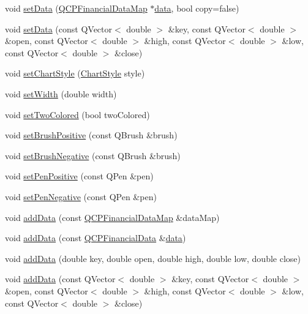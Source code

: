 \begin{DoxyCompactItemize}
\item 
void \hyperlink{classQCPFinancial_adf12a86082f1e488df6a4e8603f8fd6d}{set\-Data} (\hyperlink{qcustomplot_8h_a745c09823fae0974b50beca9bc3b3d7d}{\-Q\-C\-P\-Financial\-Data\-Map} $\ast$\hyperlink{classQCPFinancial_a58e05aefa057d16edfcc0334cf81c241}{data}, bool copy=false)
\item 
void \hyperlink{classQCPFinancial_a886881339d6447432af55adaad748c3c}{set\-Data} (const \-Q\-Vector$<$ double $>$ \&key, const \-Q\-Vector$<$ double $>$ \&open, const \-Q\-Vector$<$ double $>$ \&high, const \-Q\-Vector$<$ double $>$ \&low, const \-Q\-Vector$<$ double $>$ \&close)
\item 
void \hyperlink{classQCPFinancial_a5a59175d36279d71596e64d7bb65596f}{set\-Chart\-Style} (\hyperlink{classQCPFinancial_a0f800e21ee98d646dfc6f8f89d10ebfb}{\-Chart\-Style} style)
\item 
void \hyperlink{classQCPFinancial_a99633f8bac86a61d534ae5eeb1a3068f}{set\-Width} (double width)
\item 
void \hyperlink{classQCPFinancial_a138e44aac160a17a9676652e240c5f08}{set\-Two\-Colored} (bool two\-Colored)
\item 
void \hyperlink{classQCPFinancial_a5ebff2b1764efd07cc44942e67821829}{set\-Brush\-Positive} (const \-Q\-Brush \&brush)
\item 
void \hyperlink{classQCPFinancial_a8bbdd87629f9144b3ef51af660c0961a}{set\-Brush\-Negative} (const \-Q\-Brush \&brush)
\item 
void \hyperlink{classQCPFinancial_ac58aa3adc7a35aab0088764b840683e5}{set\-Pen\-Positive} (const \-Q\-Pen \&pen)
\item 
void \hyperlink{classQCPFinancial_afe5c07e94ccea01a75b3a2476993c346}{set\-Pen\-Negative} (const \-Q\-Pen \&pen)
\item 
void \hyperlink{classQCPFinancial_a1a83396f97fcc68f2b7aa8d9782feffe}{add\-Data} (const \hyperlink{qcustomplot_8h_a745c09823fae0974b50beca9bc3b3d7d}{\-Q\-C\-P\-Financial\-Data\-Map} \&data\-Map)
\item 
void \hyperlink{classQCPFinancial_a3b6144b48a6a8e63236fc5bf70d40c00}{add\-Data} (const \hyperlink{classQCPFinancialData}{\-Q\-C\-P\-Financial\-Data} \&\hyperlink{classQCPFinancial_a58e05aefa057d16edfcc0334cf81c241}{data})
\item 
void \hyperlink{classQCPFinancial_a688bbd052e00a02954ddb0068b378170}{add\-Data} (double key, double open, double high, double low, double close)
\item 
void \hyperlink{classQCPFinancial_aa1abe3bdafb297497f09cdbdc4db3958}{add\-Data} (const \-Q\-Vector$<$ double $>$ \&key, const \-Q\-Vector$<$ double $>$ \&open, const \-Q\-Vector$<$ double $>$ \&high, const \-Q\-Vector$<$ double $>$ \&low, const \-Q\-Vector$<$ double $>$ \&close)

\end{DoxyCompactItemize}
